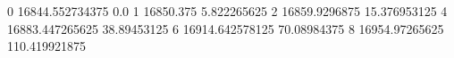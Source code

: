 0 16844.552734375 0.0
1 16850.375 5.822265625
2 16859.9296875 15.376953125
4 16883.447265625 38.89453125
6 16914.642578125 70.08984375
8 16954.97265625 110.419921875
